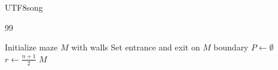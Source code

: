 \documentclass[10.5pt,compsoc]{CjC}
\theoremstyle{mystyle}
\begin{document}
\begin{CJK*}{UTF8}{song}
\begin{thebibliography}{99}










\end{thebibliography}

  

\begin{strip}
\end{strip}


\vskip 100mm


\begin{algorithm}
\caption{Maze Generation}
\begin{algorithmic}[1]
    \State Initialize maze $M$ with walls
    \State Set entrance and exit on $M$ boundary
    \State $P \gets \emptyset$
    \State $r \gets \frac{n+1}{2}$
    \State {}
    \State {}
    \State {}
    \State \Return $M$
\EndFunction


\end{algorithmic}
\end{algorithm}
\end{CJK*}
\end{document}

